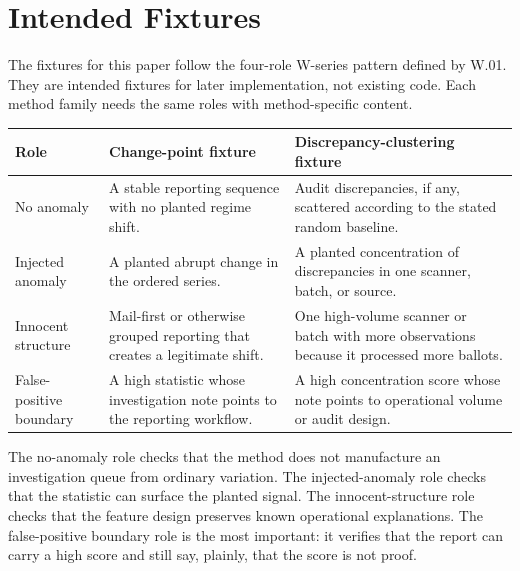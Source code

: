 \section{Intended Fixtures}

The fixtures for this paper follow the four-role W-series pattern defined by
W.01. They are intended fixtures for later implementation, not existing code.
Each method family needs the same roles with method-specific content.

\begin{center}
\small
\begin{tabularx}{\textwidth}{lXX}
\toprule
Role & Change-point fixture & Discrepancy-clustering fixture \\
\midrule
No anomaly & A stable reporting sequence with no planted regime shift. & Audit discrepancies, if any, scattered according to the stated random baseline. \\
Injected anomaly & A planted abrupt change in the ordered series. & A planted concentration of discrepancies in one scanner, batch, or source. \\
Innocent structure & Mail-first or otherwise grouped reporting that creates a legitimate shift. & One high-volume scanner or batch with more observations because it processed more ballots. \\
False-positive boundary & A high statistic whose investigation note points to the reporting workflow. & A high concentration score whose note points to operational volume or audit design. \\
\bottomrule
\end{tabularx}
\end{center}

The no-anomaly role checks that the method does not manufacture an
investigation queue from ordinary variation. The injected-anomaly role checks
that the statistic can surface the planted signal. The innocent-structure role
checks that the feature design preserves known operational explanations. The
false-positive boundary role is the most important: it verifies that the report
can carry a high score and still say, plainly, that the score is not proof.
